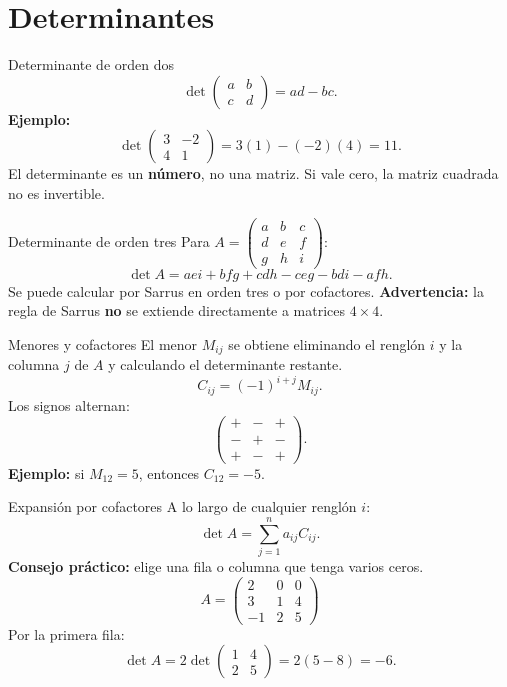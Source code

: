 \documentclass[aspectratio=169,11pt]{beamer}
\begin{document}
\section{Determinantes}
\begin{frame}{Determinante de orden dos}
\[\det\begin{pmatrix}a&b\\c&d\end{pmatrix}=ad-bc.\]
\textbf{Ejemplo:}
\[\det\begin{pmatrix}3&-2\\4&1\end{pmatrix}=3(1)-(-2)(4)=11.\]
El determinante es un \textbf{número}, no una matriz. Si vale cero, la matriz cuadrada no es invertible.
\end{frame}
\begin{frame}{Determinante de orden tres}
Para $A=\begin{pmatrix}a&b&c\\d&e&f\\g&h&i\end{pmatrix}$:
\[\det A=aei+bfg+cdh-ceg-bdi-afh.\]
Se puede calcular por Sarrus en orden tres o por cofactores.
\textbf{Advertencia:} la regla de Sarrus \textbf{no} se extiende directamente a matrices $4\times4$.
\end{frame}
\begin{frame}{Menores y cofactores}
El menor $M_{ij}$ se obtiene eliminando el renglón $i$ y la columna $j$ de $A$ y calculando el determinante restante.
\[C_{ij}=(-1)^{i+j}M_{ij}.\]
Los signos alternan:
\[\begin{pmatrix}+&-&+\\-&+&-\\+&-&+\end{pmatrix}.\]
\textbf{Ejemplo:} si $M_{12}=5$, entonces $C_{12}=-5$.
\end{frame}
\begin{frame}{Expansión por cofactores}
A lo largo de cualquier renglón $i$:
\[\det A=\sum_{j=1}^n a_{ij}C_{ij}.\]
\textbf{Consejo práctico:} elige una fila o columna que tenga varios ceros.
\[A=\begin{pmatrix}2&0&0\\3&1&4\\-1&2&5\end{pmatrix}\]
Por la primera fila:
\[\det A=2\det\begin{pmatrix}1&4\\2&5\end{pmatrix}=2(5-8)=-6.\]
\end{frame}
\end{document}
